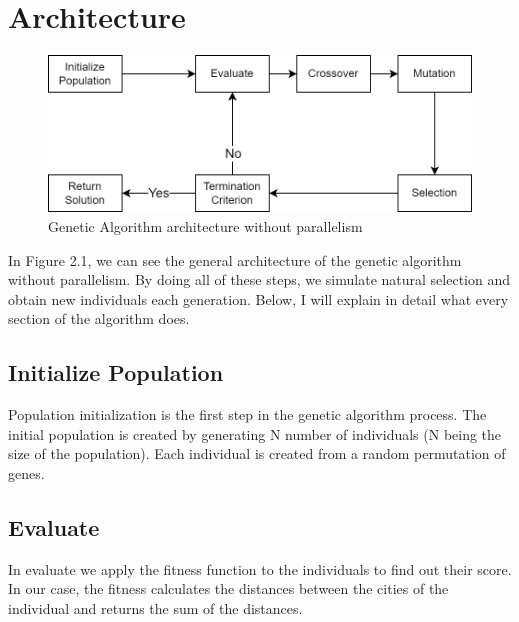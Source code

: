 \newpage
\section{Architecture}
\begin{figure}[ht]
\includegraphics[width=\textwidth]{images/ga_1.png}
\caption{Genetic Algorithm architecture without parallelism}
\end{figure}
In Figure 2.1, we can see the general architecture of the genetic algorithm without parallelism. By doing all of these steps, we simulate natural selection and obtain new individuals each generation. Below, I will explain in detail what every section of the algorithm does.
\subsection{Initialize Population}
Population initialization is the first step in the genetic algorithm process. The initial population is created by generating N number of individuals (N being the size of the population). Each individual is created from a random permutation of genes.
\subsection{Evaluate}
In evaluate we apply the fitness function to the individuals to find out their score. In our case, the fitness calculates the distances between the cities of the individual and returns the sum of the distances.
